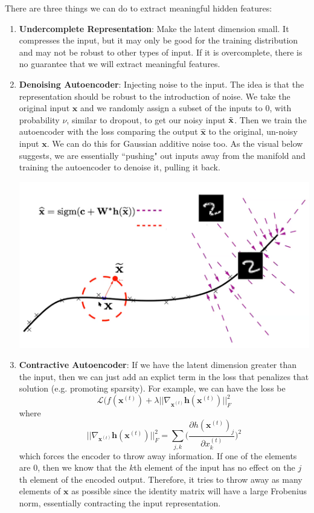 \documentclass{article}
\begin{document}
    There are three things we can do to extract meaningful hidden features: 
    \begin{enumerate}
      \item \textbf{Undercomplete Representation}: Make the latent dimension small. It compresses the input, but it may only be good for the training distribution and may not be robust to other types of input. If it is overcomplete, there is no guarantee that we will extract meaningful features. 

      \item \textbf{Denoising Autoencoder}: Injecting noise to the input. The idea is that the representation should be robust to the introduction of noise. We take the original input $\mathbf{x}$ and we randomly assign a subset of the inputs to $0$, with probability $\nu$, similar to dropout, to get our noisy input $\Tilde{\mathbf{x}}$. Then we train the autoencoder with the loss comparing the output $\hat{\mathbf{x}}$ to the original, un-noisy input $\mathbf{x}$. We can do this for Gaussian additive noise too. As the visual below suggests, we are essentially ``pushing" out inputs away from the manifold and training the autoencoder to denoise it, pulling it back. 

        \begin{center}
            \includegraphics[scale=0.3]{img/05_Encoder_Decoder/denoising_autoencoder.png}
        \end{center}
    
      \item \textbf{Contractive Autoencoder}: If we have the latent dimension greater than the input, then we can just add an explict term in the loss that penalizes that solution (e.g. promoting sparsity). For example, we can have the loss be 
      \[\mathcal{L}(f(\mathbf{x}^{(t)}) + \lambda || \nabla_{\mathbf{x}^{(t)}} \mathbf{h}(\mathbf{x}^{(t)})||^2_F\]
      where 
      \[||\nabla_{\mathbf{x}^{(t)}} \mathbf{h}(\mathbf{x}^{(t)})||_F^2 = \sum_{j, k} \bigg(\frac{\partial h(\mathbf{x}^{(t)})_j}{\partial x_k^{(t)}} \bigg)^2\]
      which forces the encoder to throw away information. If one of the elements are $0$, then we know that the $k$th element of the input has no effect on the $j$th element of the encoded output. Therefore, it tries to throw away as many elements of $\mathbf{x}$ as possible since the identity matrix will have a large Frobenius norm, essentially contracting the input representation.  


\end{enumerate}
\end{document}
